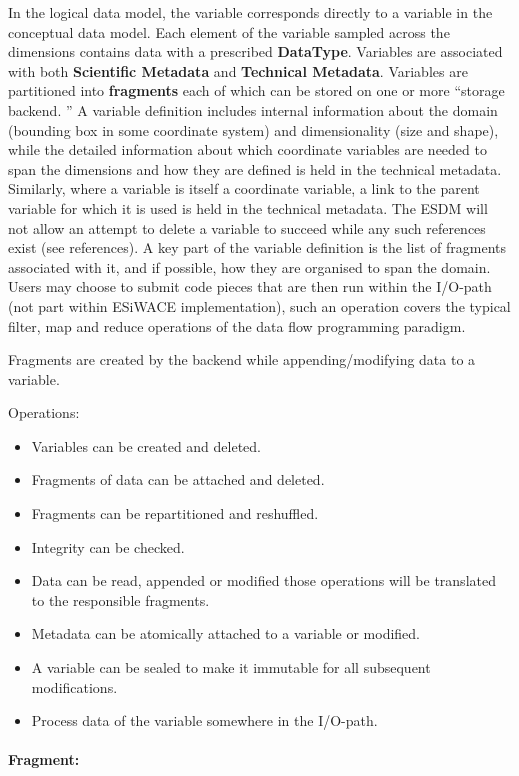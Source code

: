 In the logical data model, the variable corresponds directly to a variable in the conceptual data model.
Each element of the variable sampled across the dimensions contains data with a prescribed \textbf{DataType}.
Variables are associated with both \textbf{Scientific Metadata} and \textbf{Technical Metadata}.
Variables are partitioned into \textbf{fragments} each of which can be stored on one or more ``storage backend.
'' A variable definition includes internal information about the domain (bounding box in some coordinate system) and dimensionality (size and shape), while the detailed information about which coordinate variables are needed to span the dimensions and how they are defined is held in the technical metadata.
Similarly, where a variable is itself a coordinate variable, a link to the parent variable for which it is used is held in the technical metadata.
The ESDM will not allow an attempt to delete a variable to succeed while any such references exist (see references).
A key part of the variable definition is the list of fragments associated with it, and if possible, how they are organised to span the domain.
Users may choose to submit code pieces that are then run within the I/O-path (not part within ESiWACE implementation), such an operation covers the typical filter, map and reduce operations of the data flow programming paradigm.
 
Fragments are created by the backend while appending/modifying data to a variable.


Operations:

\begin{itemize}
  \item Variables can be created and deleted.
  \item Fragments of data can be attached and deleted.
  \item Fragments can be repartitioned and reshuffled.
  \item Integrity can be checked.
  \item Data can be read, appended or modified those operations will be translated to the responsible fragments.
  \item Metadata can be atomically attached to a variable or modified.
  \item A variable can be sealed to make it immutable for all subsequent modifications.
  \item Process data of the variable somewhere in the I/O-path.
\end{itemize}

\paragraph{Fragment:}%
\label{fragment}

